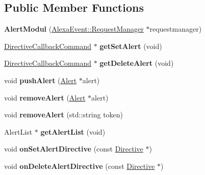 \subsection*{Public Member Functions}
\begin{DoxyCompactItemize}
\item 
\mbox{\label{classdirective_1_1AlertModul_a4a0797ca6ef03cafb4cd4a5876780539}} 
{\bfseries Alert\+Modul} (\hyperlink{classAlexaEvent_1_1RequestManager}{Alexa\+Event\+::\+Request\+Manager} $\ast$requestmanager)
\item 
\mbox{\label{classdirective_1_1AlertModul_a47933137dba58d07a58572e94bffacc0}} 
\hyperlink{classdirective_1_1DirectiveCallbackCommand}{Directive\+Callback\+Command} $\ast$ {\bfseries get\+Set\+Alert} (void)
\item 
\mbox{\label{classdirective_1_1AlertModul_a15472f9760f88a6665dafcf6567fff72}} 
\hyperlink{classdirective_1_1DirectiveCallbackCommand}{Directive\+Callback\+Command} $\ast$ {\bfseries get\+Delete\+Alert} (void)
\item 
\mbox{\label{classdirective_1_1AlertModul_ab1f2012e1c31912658e571be3aade393}} 
void {\bfseries push\+Alert} (\hyperlink{classdirective_1_1Alert}{Alert} $\ast$alert)
\item 
\mbox{\label{classdirective_1_1AlertModul_a5c04e3ceacb8d483c6cc71190fa21cd7}} 
void {\bfseries remove\+Alert} (\hyperlink{classdirective_1_1Alert}{Alert} $\ast$alert)
\item 
\mbox{\label{classdirective_1_1AlertModul_a8e8bf0e178fc5803cebb8102f42006b1}} 
void {\bfseries remove\+Alert} (std\+::string token)
\item 
\mbox{\label{classdirective_1_1AlertModul_a41c5464419d48d2965fa1b0165301e8d}} 
Alert\+List $\ast$ {\bfseries get\+Alert\+List} (void)
\item 
\mbox{\label{classdirective_1_1AlertModul_a74eaf4bf9da88a884b811b474db5b02e}} 
void {\bfseries on\+Set\+Alert\+Directive} (const \hyperlink{classdirective_1_1Directive}{Directive} $\ast$)
\item 
\mbox{\label{classdirective_1_1AlertModul_adb6777eb833bca86b7b477e9ef932be2}} 
void {\bfseries on\+Delete\+Alert\+Directive} (const \hyperlink{classdirective_1_1Directive}{Directive} $\ast$)
\end{DoxyCompactItemize}
